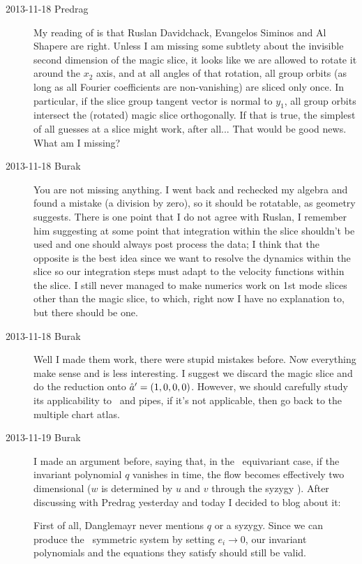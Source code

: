 \begin{description}
\item[2013-11-18 Predrag] My reading of
 is that Ruslan Davidchack, Evangelos Siminos
and Al Shapere are right. Unless I am missing some subtlety about the
invisible second dimension of the magic slice, it looks like we are
allowed to rotate it around the $x_2$ axis, and at all angles of that
rotation, all group orbits (as long as all Fourier coefficients are non-vanishing)
are sliced only once. In particular, if the slice group tangent vector is normal to
$y_1$, all group orbits intersect the (rotated) magic slice orthogonally.
If that is true, the simplest of all guesses at a slice might work, after all...
That would be good news.
What am I missing?

\item[2013-11-18 Burak] You are not missing anything. I went back and rechecked
my algebra and found a mistake (a division by zero), so it should be rotatable,
as geometry suggests. There is one point that I do not agree with Ruslan, I
remember him suggesting at some point that integration within the slice shouldn't
be used and one should always post process the data; I think that the opposite
is the best idea since we want to resolve the dynamics within the slice so
our integration steps must adapt to the velocity functions within the slice.
I still never managed to make numerics work on 1st mode slices other than
the magic slice, to which, right now I have no explanation to, but there should
be one.

\item[2013-11-18 Burak] Well I made them work, there were stupid mistakes before.
Now everything make sense and is less interesting. I suggest we discard the
magic slice and do the reduction onto ${\hat{a}'} = (1,0,0,0)$. However, we
should carefully study its applicability to \KS\ and pipes, if it's not
applicable, then go back to the multiple chart atlas.

\item[2013-11-19 Burak] I made an argument before, saying that, in the \
equivariant case, if the invariant polynomial $q$ vanishes in time, the flow
becomes effectively two dimensional ($w$ is determined by $u$ and $v$ through
the syzygy \refeq{eq:syzPK}). After discussing with Predrag yesterday and today
I decided to blog about it:

First of all, Danglemayr  never mentions $q$ or a syzygy. Since
we can produce the \On{2}\ symmetric system by setting $e_i \rightarrow 0$,
our invariant polynomials and the equations they satisfy should still be valid.


\end{description}
